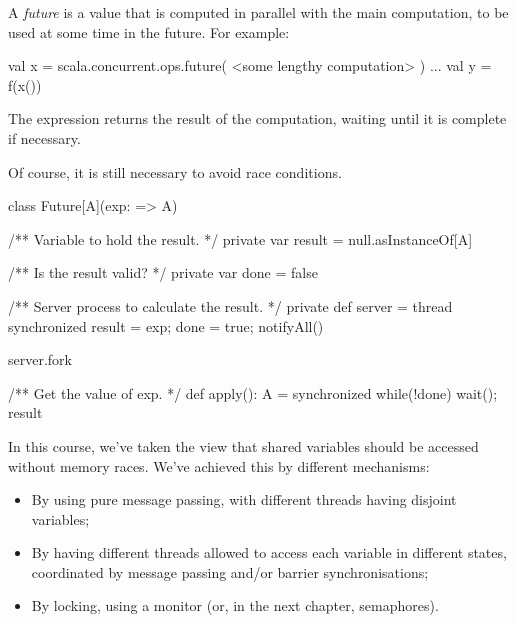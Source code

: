 \documentclass[notes,color]{sepslide0}
\begin{document}



\begin{slide}

A \emph{future} is a value that is computed in parallel with the main
computation, to be used at some time in the future.  For example:
%
\begin{scala}
val x = scala.concurrent.ops.future(
  <some lengthy computation>
)
...
val y = f(x())
\end{scala}
%
The expression  returns the result of the computation, waiting
until it is complete if necessary.

Of course, it is still necessary to avoid race conditions.
\end{slide}


\begin{slide}

\begin{scala}
class Future[A](exp: => A){
  /** Variable to hold the result. */
  private var result = null.asInstanceOf[A]

  /** Is the result valid? */
  private var done = false

  /** Server process to calculate the result. */
  private def server = thread{
    synchronized{ result = exp; done = true; notifyAll() }
  }

  server.fork

  /** Get the value of exp. */
  def apply(): A = synchronized{ while(!done) wait(); result }
}
\end{scala}
\end{slide}


\begin{slide}

In this course, we've taken the view that shared variables should be accessed
without memory races.  We've achieved this by different mechanisms:
%
\begin{itemize}
\item By using pure message passing, with different threads having disjoint
  variables;

\item By having different threads allowed to access each variable in different
  states, coordinated by message passing and/or barrier synchronisations;

\item By locking, using a monitor (or, in the next chapter, semaphores).
\end{itemize}
\end{slide}
\end{document}
